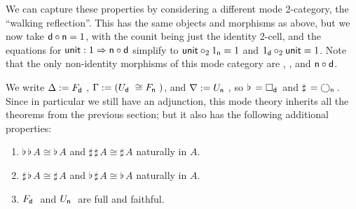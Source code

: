 \documentclass{drl-common/llncs}
\newcommand{\tc}[2]{\ensuremath{#1 \Rightarrow #2}}
\newcommand\compo[2]{\ensuremath{#1 \circ #2}}
\newcommand\comph[2]{\ensuremath{#1 \mathbin{\circ_2} #2}}
\newcommand\F[2]{\ensuremath{F_{#1} \,\, #2}}
\newcommand\U[2]{\ensuremath{U_{#1} \,\, #2}}
\newcommand\Bx[2]{\ensuremath{\Box_{#1} \, {#2}}}
\newcommand\Crc[2]{\ensuremath{\bigcirc_{#1} \, {#2}}}
\newcommand\Flat[1]{\ensuremath{\flat \, {#1}}}
\newcommand\Sharp[1]{\ensuremath{\sharp \, {#1}}}
\newcommand\iso{\cong}
\begin{document}
We can capture these properties by considering a different mode
2-category, the ``walking reflection''.  This has the same objects and
morphisms as above, but we now take $\compo{\dsd d}{\dsd n} = 1$, with
the counit being just the identity 2-cell, and the equations for
$\dsd{unit} : \tc {1} {\compo{\dsd n}{\dsd d}}$ simplify to
$\comph{\dsd{unit}}{1_{\dsd n}} = 1$ and $\comph{1_{\dsd d}}{\dsd{unit}}
= 1$.  Note that the only non-identity morphisms of this mode category
are , , and \compo{\dsd{n}}{\dsd{d}}.  

We write $\Delta := \F{\dsd{d}}{}$, $\Gamma := (\U{\dsd d}{} \iso
\F{\dsd n}{})$, and $\nabla := \U{\dsd{n}}{}$, so $\Flat{} =
\Bx{\dsd{d}}{}$ and $\Sharp{} = \Crc{\dsd{n}}{}$.  Since in particular
we still have an adjunction, this mode theory inherits all the theorems
from the previous section; but it also has the following additional
properties:

\begin{theorem}
\begin{enumerate}
\item $\Flat{\Flat A} \iso \Flat A$ and $\Sharp{\Sharp A} \iso \Sharp A$
  naturally in $A$.
\item $\Sharp{\Flat A} \iso \Sharp{A}$ 
and $\Flat{\Sharp A} \iso \Flat{A}$ naturally in $A$.
\item \F{\dsd{d}}{} and \U{\dsd{n}}{} are full and faithful.
\end{enumerate}
\end{theorem}
\end{document}
